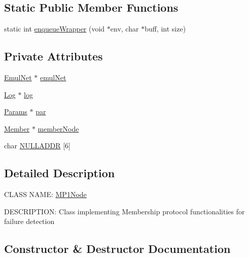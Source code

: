 \subsection*{Static Public Member Functions}
\begin{DoxyCompactItemize}
\item 
static int \hyperlink{class_m_p1_node_af45c64abc521a0674234ec4a0621b4e1}{enqueue\+Wrapper} (void $\ast$env, char $\ast$buff, int size)
\end{DoxyCompactItemize}
\subsection*{Private Attributes}
\begin{DoxyCompactItemize}
\item 
\hyperlink{class_emul_net}{Emul\+Net} $\ast$ \hyperlink{class_m_p1_node_a449d3fc835bd980a1fd9af2072f05b0e}{emul\+Net}
\item 
\hyperlink{class_log}{Log} $\ast$ \hyperlink{class_m_p1_node_aaba40df80a4669363245ac74c3ff19f5}{log}
\item 
\hyperlink{class_params}{Params} $\ast$ \hyperlink{class_m_p1_node_ae2fee312946f5db771601f0c1b05f50d}{par}
\item 
\hyperlink{class_member}{Member} $\ast$ \hyperlink{class_m_p1_node_a328d012a8827407b51ea765ee420b8a3}{member\+Node}
\item 
char \hyperlink{class_m_p1_node_a796defbef0578537c785a1c806127bb4}{N\+U\+L\+L\+A\+D\+D\+R} \mbox{[}6\mbox{]}
\end{DoxyCompactItemize}


\subsection{Detailed Description}
C\+L\+A\+S\+S N\+A\+M\+E\+: \hyperlink{class_m_p1_node}{M\+P1\+Node}

D\+E\+S\+C\+R\+I\+P\+T\+I\+O\+N\+: Class implementing Membership protocol functionalities for failure detection 

\subsection{Constructor \& Destructor Documentation}
\hypertarget{class_m_p1_node_a7ee5f216f4d59ee4e80028f346a71e80}{}
